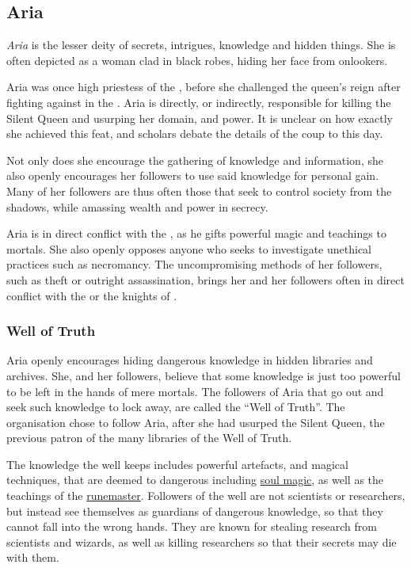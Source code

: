 \subsection{Aria}
\label{sec:Aria}

\emph{Aria} is the lesser deity of secrets, intrigues, knowledge and hidden
things. She is often depicted as a woman clad in black robes, hiding her face
from onlookers.

Aria was once high priestess of the , before she
challenged the queen's reign after fighting against 
in the . Aria is directly, or indirectly,
responsible for killing the Silent Queen and usurping her domain, and
power. It is unclear on how exactly she achieved this feat, and scholars
debate the details of the coup to this day.

Not only does she encourage the gathering of knowledge and information, she
also openly encourages her followers to use said knowledge for personal gain.
Many of her followers are thus often those that seek to control society from
the shadows, while amassing wealth and power in secrecy.

Aria is in direct conflict with the , as he gifts
powerful magic and teachings to mortals. She also openly opposes anyone who
seeks to investigate unethical practices such as necromancy. The
uncompromising methods of her followers, such as theft or outright
assassination, brings her and her followers often in direct conflict with the
 or the knights of .

\subsubsection{Well of Truth}
\label{sec:Well of Truth}

Aria openly encourages hiding dangerous knowledge in hidden libraries and
archives. She, and her followers, believe that some knowledge is just too
powerful to be left in the hands of mere mortals. The followers of Aria
that go out and seek such knowledge to lock away, are called the ``Well of
  Truth''. The organisation chose to follow Aria, after she had usurped the
Silent Queen, the previous patron of the many libraries of the Well of Truth.

The knowledge the well keeps includes powerful artefacts, and magical
techniques, that are deemed to dangerous including \hyperref[sec:Soul
  Magic]{soul magic}, as well as the teachings of the
\hyperref[sec:Runemaster]{runemaster}. Followers of the well are not
scientists or researchers, but instead see themselves as guardians of
dangerous knowledge, so that they cannot fall into the wrong hands. They are
known for stealing research from scientists and wizards, as well as killing
researchers so that their secrets may die with them.

